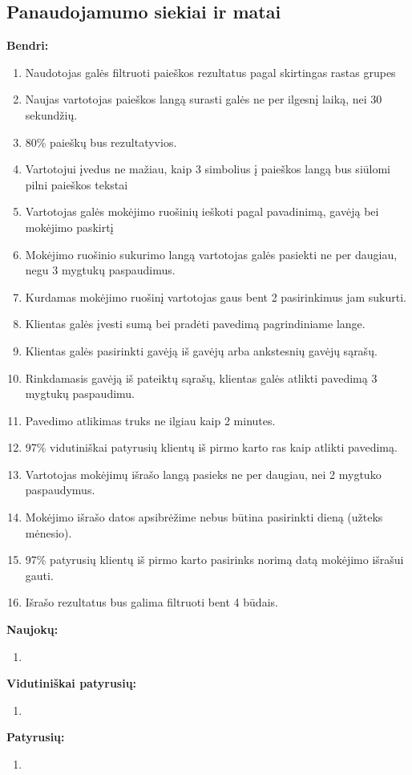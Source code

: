 \documentclass{VUMIFPSkursinis}
\begin{document}
\subsection{Panaudojamumo siekiai ir matai}
	\textbf{Bendri:}
\begin{enumerate}
	\item Naudotojas galės filtruoti paieškos rezultatus pagal skirtingas rastas grupes
	\item Naujas vartotojas paieškos langą surasti galės ne per ilgesnį laiką, nei 30 sekundžių.
	\item 80\% paieškų bus rezultatyvios.
	\item Vartotojui įvedus ne mažiau, kaip 3 simbolius į paieškos langą bus siūlomi pilni paieškos tekstai
	\item Vartotojas galės mokėjimo ruošinių ieškoti pagal pavadinimą, gavėją bei mokėjimo paskirtį
	\item Mokėjimo ruošinio sukurimo langą vartotojas galės pasiekti ne per daugiau, negu 3 mygtukų paspaudimus.
	\item Kurdamas mokėjimo ruošinį vartotojas gaus bent 2 pasirinkimus jam sukurti.
	\item Klientas galės įvesti sumą bei pradėti pavedimą pagrindiniame lange.
	\item Klientas galės pasirinkti gavėją iš gavėjų arba ankstesnių gavėjų sąrašų.
	\item Rinkdamasis gavėją iš pateiktų sąrašų, klientas galės atlikti pavedimą 3 mygtukų paspaudimu.
	\item Pavedimo atlikimas truks ne ilgiau kaip 2 minutes.
	\item 97\% vidutiniškai patyrusių klientų iš pirmo karto ras kaip atlikti pavedimą.
	\item Vartotojas mokėjimų išrašo langą pasieks ne per daugiau, nei 2 mygtuko paspaudymus.
	\item Mokėjimo išrašo datos apsibrėžime nebus būtina pasirinkti dieną (užteks mėnesio).
	\item 97\% patyrusių klientų iš pirmo karto pasirinks norimą datą mokėjimo išrašui gauti.
	\item Išrašo rezultatus bus galima filtruoti bent 4 būdais.
\end{enumerate}
	\textbf{Naujokų:}
\begin{enumerate}[resume]
  \item
\end{enumerate}
	\textbf{Vidutiniškai patyrusių:}
\begin{enumerate}[resume]
	\item
\end{enumerate}
\textbf{Patyrusių:}
\begin{enumerate}[resume]
	\item
\end{enumerate}
\pagebreak
\end{document}

